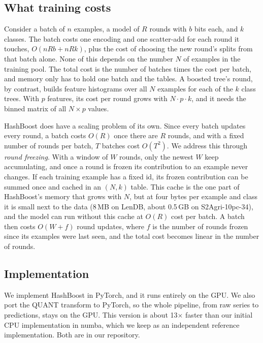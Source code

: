 \documentclass[a4paper, 11pt]{article}
\begin{document}
\subsection{What training costs}
\label{sec:freezing}

Consider a batch of $n$ examples, a model of $R$ rounds with $b$ bits each,
and $k$ classes. The batch costs one encoding and one scatter-add for each
round it touches, $O(nRb + nRk)$, plus the cost of choosing the new round's
splits from that batch alone. None of this depends on the number $N$ of
examples in the training pool. The total cost is the number of batches
times the cost per batch, and memory only has to hold one batch and the
tables. A boosted tree's round, by contrast, builds feature histograms over
all $N$ examples for each of the $k$ class trees. With $p$ features, its
cost per round grows with $N \cdot p \cdot k$, and it needs the binned
matrix of all $N \times p$ values.

HashBoost does have a scaling problem of its own. Since every batch updates
every round, a batch costs $O(R)$ once there are $R$ rounds, and with a
fixed number of rounds per batch, $T$ batches cost $O(T^2)$. We address this
through \emph{round freezing}. With a window of $W$ rounds, only the newest
$W$ keep accumulating, and once a round is frozen its contribution to an
example never changes. If each training example has a fixed id, its frozen
contribution can be summed once and cached in an $(N, k)$ table. This
cache is the one part of HashBoost's memory that grows with $N$, but at four
bytes per example and class it is small next to the data (8\,MB on LenDB,
about 0.5\,GB on S2Agri-10pc-34), and the model can run without this cache at
$O(R)$ cost per batch. A batch then
costs $O(W + f)$ round updates, where $f$ is the number of rounds frozen
since its examples were last seen, and the total cost becomes linear in the
number of rounds.

\subsection{Implementation}
\label{sec:implementation}

We implement HashBoost in PyTorch, and it runs entirely on the GPU. We also
port the QUANT transform to PyTorch, so the whole pipeline, from raw series
to predictions, stays on the GPU. This version is about 13$\times$ faster
than our initial CPU implementation in numba, which we keep as an
independent reference implementation. Both are in our repository.
\end{document}
